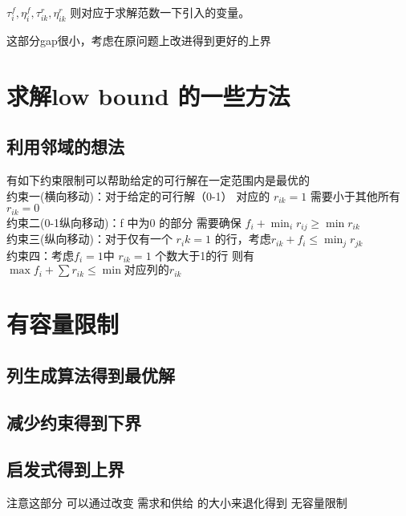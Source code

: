 \documentclass[UTF8]{article}
\begin{document}
$\tau_{i}^{f},\eta_{i}^{f},\tau_{i k}^r,\eta_{i k}^{r}$ 则对应于求解范数一下引入的变量。 \par

这部分gap很小，考虑在原问题上改进得到更好的上界

\section{求解low bound 的一些方法}

\subsection{利用邻域的想法}

有如下约束限制可以帮助给定的可行解在一定范围内是最优的 \\
约束一(横向移动)：对于给定的可行解（0-1）  对应的 $r_{ik}=1$ 需要小于其他所有 $r_{ik} = 0$ \\
约束二(0-1纵向移动)：f 中为0 的部分 需要确保  $f_i +\min_i r_{ij} \geq \min r_{ik}$ \\
约束三(纵向移动)：对于仅有一个 $r_ik=1$ 的行，考虑$r_{ik}+f_i \leq \min_j r_{jk}$ \\
约束四：考虑$f_i = 1$中 $r_{ik} =1$ 个数大于1的行 则有$\max f_i+ \sum r_{ik} \leq \min \text{对应列的} r_{ik}$

\section{有容量限制}

\subsection{列生成算法得到最优解}

\subsection{减少约束得到下界}


\subsection{启发式得到上界}

注意这部分 可以通过改变 需求和供给 的大小来退化得到 无容量限制
\end{document}
